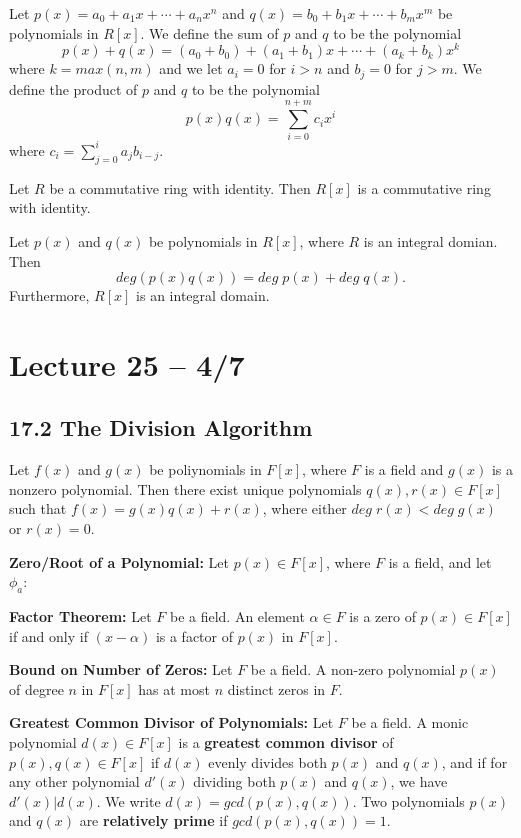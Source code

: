 \documentclass{article}
\begin{document}
Let $p(x)=a_0+a_1x+\cdots+a_nx^n$ and $q(x)=b_0+b_1x+\cdots+b_mx^m$ be polynomials in $R[x]$. We define the sum of $p$ and $q$ to be the polynomial \[p(x)+q(x)=(a_0+b_0)+(a_1+b_1)x+\cdots+(a_k+b_k)x^k\] where $k=max(n,m)$ and we let $a_i=0$ for $i>n$ and $b_j=0$ for $j>m$. We define the product of $p$ and $q$ to be the polynomial \[p(x)q(x)=\sum_{i=0}^{n+m}c_ix^i\] where $c_i=\sum_{j=0}^ia_jb_{i-j}$.

\begin{theorem}
  Let $R$ be a commutative ring with identity. Then $R[x]$ is a commutative ring with identity.
\end{theorem}
\begin{theorem}
  Let $p(x)$ and $q(x)$ be polynomials in $R[x]$, where $R$ is an integral domian. Then \[deg(p(x)q(x))=deg\;p(x)+deg\;q(x).\] Furthermore, $R[x]$ is an integral domain.
\end{theorem}

\section{Lecture 25 -- 4/7}
\subsection{17.2 The Division Algorithm}
\begin{theorem}
  Let $f(x)$ and $g(x)$ be poliynomials in $F[x]$, where $F$ is a field and $g(x)$ is a nonzero polynomial. Then there exist unique polynomials $q(x),r(x)\in F[x]$ such that $f(x)=g(x)q(x)+r(x)$, where either $deg\;r(x)<deg\;g(x)$ or $r(x)=0$.
\end{theorem}

\textbf{Zero/Root of a Polynomial:} Let $p(x)\in F[x]$, where $F$ is a field, and let $\phi_a:$

\begin{theorem}
  \textbf{Factor Theorem:} Let $F$ be a field. An element $\alpha\in F$ is a zero of $p(x)\in F[x]$ if and only if $(x-\alpha)$ is a factor of $p(x)$ in $F[x]$.
\end{theorem}

\begin{theorem}
  \textbf{Bound on Number of Zeros:} Let $F$ be a field. A non-zero polynomial $p(x)$ of degree $n$ in $F[x]$ has at most $n$ distinct zeros in $F$.
\end{theorem}

\textbf{Greatest Common Divisor of Polynomials:} Let $F$ be a field. A monic polynomial $d(x)\in F[x]$ is a \textbf{greatest common divisor} of $p(x),q(x)\in F[x]$ if $d(x)$ evenly divides both $p(x)$ and $q(x)$, and if for any other polynomial $d'(x)$ dividing both $p(x)$ and $q(x)$, we have $d'(x)|d(x)$.
We write $d(x)=gcd(p(x),q(x))$. Two polynomials $p(x)$ and $q(x)$ are \textbf{relatively prime} if $gcd(p(x),q(x))=1$.
\end{document}
